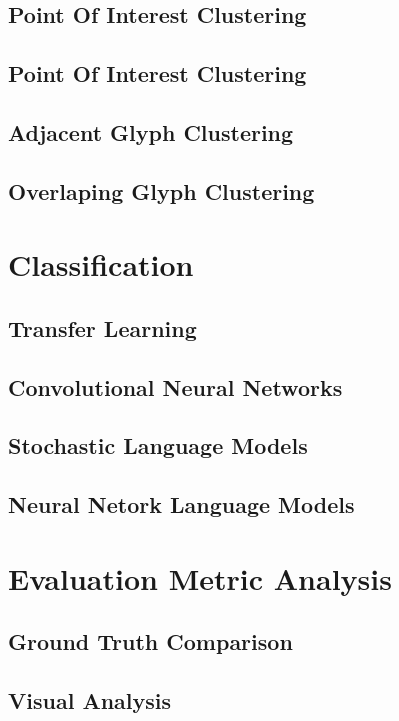 \subsection{Point Of Interest Clustering}

\subsection{Point Of Interest Clustering}
\todo{}

\subsection{Adjacent Glyph Clustering}
\todo{}

\subsection{Overlaping Glyph Clustering}
\todo{}


\section{Classification}

\subsection{Transfer Learning}
\todo{}

\subsection{Convolutional Neural Networks}
\todo{}

\subsection{Stochastic Language Models}
\todo{}

\subsection{Neural Netork Language Models}
\todo{}


\section{Evaluation Metric Analysis}

\subsection{Ground Truth Comparison}
\todo{}

\subsection{Visual Analysis}
\todo{}
